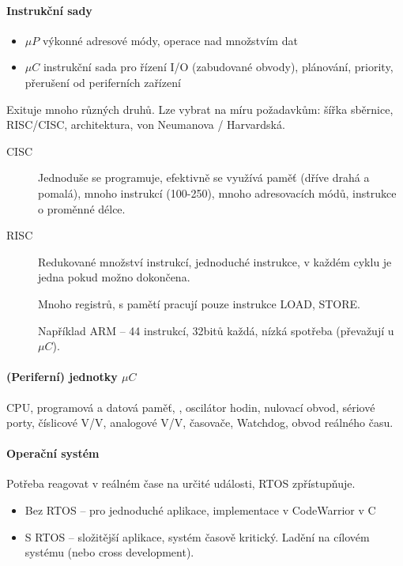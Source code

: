 \documentclass[a4paper, 11pt]{report}
\begin{document}
\paragraph{Instrukční sady}
\begin{itemize}
	\item $\mu P$ výkonné adresové módy, operace nad množstvím dat
	\item $\mu C$ instrukční sada pro řízení I/O (zabudované obvody), plánování, priority, přerušení od periferních zařízení
\end{itemize}

Exituje mnoho různých druhů. Lze vybrat na míru požadavkům: šířka sběrnice, RISC/CISC, architektura, von Neumanova / Harvardská.

\begin{description}
	\item[CISC] Jednoduše se programuje, efektivně se využívá paměť (dříve drahá a pomalá), mnoho instrukcí (100-250), mnoho adresovacích módů, instrukce o proměnné délce.
	\item[RISC] Redukované množství instrukcí, jednoduché instrukce, v každém cyklu je jedna pokud možno dokončena.
	
	Mnoho registrů, s pamětí pracují pouze instrukce LOAD, STORE.
	
	Například ARM -- 44 instrukcí, 32bitů každá, nízká spotřeba (převažují u $\mu C$).
\end{description}

\paragraph{(Periferní) jednotky $\mu C$}
CPU, programová a datová paměť, , oscilátor hodin, nulovací obvod, sériové porty, číslicové V/V, analogové V/V, časovače, Watchdog, obvod reálného času.

\paragraph{Operační systém} Potřeba reagovat v reálném čase na určité události, RTOS zpřístupňuje.
\begin{itemize}
	\item Bez RTOS -- pro jednoduché aplikace, implementace v CodeWarrior v C
	\item S RTOS -- složitější aplikace, systém časově kritický. Ladění na cílovém systému (nebo cross development).
\end{itemize}
\end{document}
